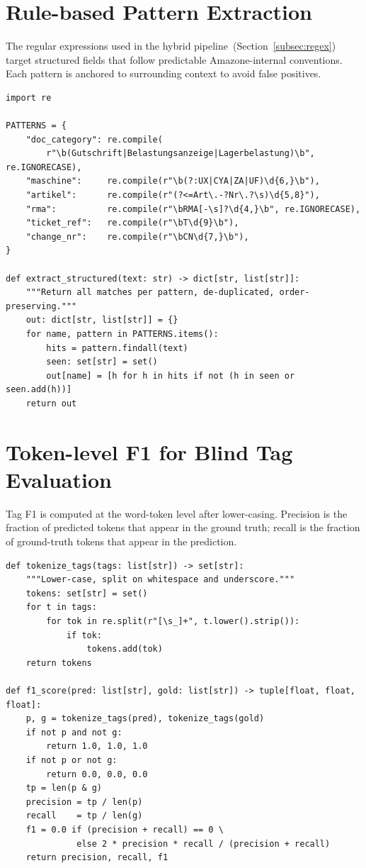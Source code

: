\section{Rule-based Pattern Extraction}
\label{sec:app-regex}
%
The regular expressions used in the hybrid pipeline~(Section~\ref{subsec:regex})
target structured fields that follow predictable Amazone-internal conventions.
Each pattern is anchored to surrounding context to avoid false positives.

\begin{verbatim}
import re

PATTERNS = {
    "doc_category": re.compile(
        r"\b(Gutschrift|Belastungsanzeige|Lagerbelastung)\b", re.IGNORECASE),
    "maschine":     re.compile(r"\b(?:UX|CYA|ZA|UF)\d{6,}\b"),
    "artikel":      re.compile(r"(?<=Art\.-?Nr\.?\s)\d{5,8}"),
    "rma":          re.compile(r"\bRMA[-\s]?\d{4,}\b", re.IGNORECASE),
    "ticket_ref":   re.compile(r"\bT\d{9}\b"),
    "change_nr":    re.compile(r"\bCN\d{7,}\b"),
}

def extract_structured(text: str) -> dict[str, list[str]]:
    """Return all matches per pattern, de-duplicated, order-preserving."""
    out: dict[str, list[str]] = {}
    for name, pattern in PATTERNS.items():
        hits = pattern.findall(text)
        seen: set[str] = set()
        out[name] = [h for h in hits if not (h in seen or seen.add(h))]
    return out
\end{verbatim}

\section{Token-level F1 for Blind Tag Evaluation}
\label{sec:app-f1}
%
Tag F1 is computed at the word-token level after lower-casing.  Precision is
the fraction of predicted tokens that appear in the ground truth; recall is
the fraction of ground-truth tokens that appear in the prediction.

\begin{verbatim}
def tokenize_tags(tags: list[str]) -> set[str]:
    """Lower-case, split on whitespace and underscore."""
    tokens: set[str] = set()
    for t in tags:
        for tok in re.split(r"[\s_]+", t.lower().strip()):
            if tok:
                tokens.add(tok)
    return tokens

def f1_score(pred: list[str], gold: list[str]) -> tuple[float, float, float]:
    p, g = tokenize_tags(pred), tokenize_tags(gold)
    if not p and not g:
        return 1.0, 1.0, 1.0
    if not p or not g:
        return 0.0, 0.0, 0.0
    tp = len(p & g)
    precision = tp / len(p)
    recall    = tp / len(g)
    f1 = 0.0 if (precision + recall) == 0 \
              else 2 * precision * recall / (precision + recall)
    return precision, recall, f1
\end{verbatim}

